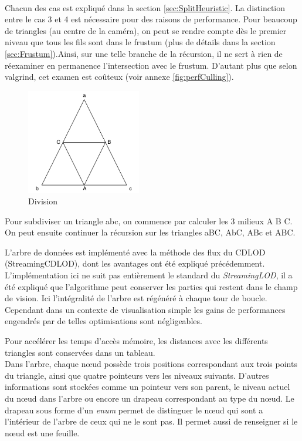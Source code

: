 	\paragraph{}
	Chacun des cas est expliqué dans la section \ref{sec:SplitHeuristic}. 
	La distinction entre le cas 3 et 4 est nécessaire pour des raisons de performance. Pour beaucoup de triangles (au centre de la caméra), on peut se rendre compte dès le premier niveau que tous les fils sont dans le frustum (plus de détails dans la section \ref{sec:Frustum}).Ainsi, sur une telle branche de la récursion, il ne sert à rien de réexaminer en permanence l'intersection avec le frustum. D'autant plus que selon valgrind, cet examen est coûteux (voir annexe \ref{fig:perfCulling}).
	
	\begin{figure}[H]
        \centerline{\includegraphics[width=5cm]{img/TriangleSplit.png}}
        \caption{Division}
        \label{fig:TriangleSplit}
    \end{figure}
    Pour subdiviser un triangle abc, on commence par calculer les 3 milieux A B C.
	 On peut ensuite continuer la récursion sur les triangles aBC, AbC, ABc et ABC.
	
\iffalse
L'arbre de données est implémenté avec la méthode des flux du CDLOD (StreamingCDLOD), dont les avantages ont été expliqué précédemment.
	L'implémentation ici ne suit pas entièrement le standard du \textit{StreamingLOD}, il a été expliqué que l'algorithme peut conserver les parties qui restent dans le champ de vision. Ici l'intégralité de l'arbre est régénéré à chaque tour de boucle. Cependant dans un contexte de visualisation simple les gains de performances engendrés par de telles optimisations sont négligeables.
	
	Pour accélérer les temps d'accès mémoire, les distances avec les différents triangles sont conservées
	dans un tableau. \\

	Dans l'arbre, chaque n\oe{}ud possède trois positions correspondant aux trois points du triangle,
	ainsi que quatre pointeurs vers les niveaux suivants.
	D'autres informations sont stockées comme un pointeur vers son parent, le niveau actuel du
	n\oe{}ud dans l'arbre ou encore un drapeau correspondant au type du n\oe{}ud.
	Le drapeau sous forme d'un \emph{enum} permet de distinguer le n\oe{}ud qui sont a l'intérieur de l'arbre de ceux
	qui ne le sont pas. Il permet aussi de renseigner si le n\oe{}ud est une feuille.
		
